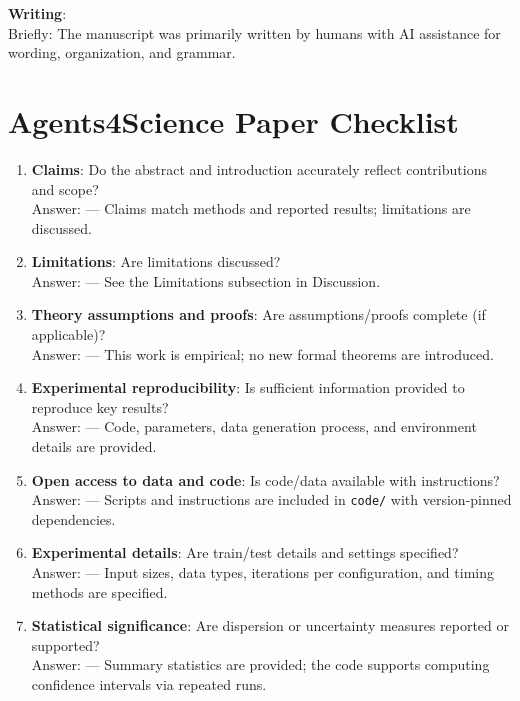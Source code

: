 \textbf{Writing}: \involvementB{}\\
Briefly: The manuscript was primarily written by humans with AI assistance for wording, organization, and grammar.

\section*{Agents4Science Paper Checklist}
\begin{enumerate}
  \item \textbf{Claims}: Do the abstract and introduction accurately reflect contributions and scope?\\
  Answer: \answerYes{} — Claims match methods and reported results; limitations are discussed.

  \item \textbf{Limitations}: Are limitations discussed?\\
  Answer: \answerYes{} — See the Limitations subsection in Discussion.

  \item \textbf{Theory assumptions and proofs}: Are assumptions/proofs complete (if applicable)?\\
  Answer: \answerNA{} — This work is empirical; no new formal theorems are introduced.

  \item \textbf{Experimental reproducibility}: Is sufficient information provided to reproduce key results?\\
  Answer: \answerYes{} — Code, parameters, data generation process, and environment details are provided.

  \item \textbf{Open access to data and code}: Is code/data available with instructions?\\
  Answer: \answerYes{} — Scripts and instructions are included in \texttt{code/} with version-pinned dependencies.

  \item \textbf{Experimental details}: Are train/test details and settings specified?\\
  Answer: \answerYes{} — Input sizes, data types, iterations per configuration, and timing methods are specified.

  \item \textbf{Statistical significance}: Are dispersion or uncertainty measures reported or supported?\\
  Answer: \answerYes{} — Summary statistics are provided; the code supports computing confidence intervals via repeated runs.


\end{enumerate}
